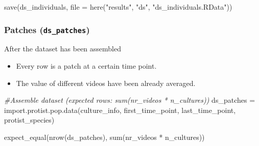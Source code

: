 \documentclass[
]{article}
\newenvironment{Shaded}{\begin{snugshade}}{\end{snugshade}}
\newcommand{\AttributeTok}[1]{\textcolor[rgb]{0.77,0.63,0.00}{#1}}
\newcommand{\CommentTok}[1]{\textcolor[rgb]{0.56,0.35,0.01}{\textit{#1}}}
\newcommand{\FunctionTok}[1]{\textcolor[rgb]{0.00,0.00,0.00}{#1}}
\newcommand{\NormalTok}[1]{#1}
\newcommand{\OtherTok}[1]{\textcolor[rgb]{0.56,0.35,0.01}{#1}}
\newcommand{\SpecialCharTok}[1]{\textcolor[rgb]{0.00,0.00,0.00}{#1}}
\newcommand{\StringTok}[1]{\textcolor[rgb]{0.31,0.60,0.02}{#1}}
\providecommand{\tightlist}{%
  \setlength{\itemsep}{0pt}\setlength{\parskip}{0pt}}
\begin{document}
\begin{Shaded}
\begin{Highlighting}[]
\FunctionTok{save}\NormalTok{(ds\_individuals, }\AttributeTok{file =} \FunctionTok{here}\NormalTok{(}\StringTok{"results"}\NormalTok{, }\StringTok{"ds"}\NormalTok{, }\StringTok{"ds\_individuals.RData"}\NormalTok{))}
\end{Highlighting}
\end{Shaded}

\hypertarget{patches-ds_patches}{%
\subsubsection{\texorpdfstring{Patches
(\texttt{ds\_patches})}{Patches (ds\_patches)}}\label{patches-ds_patches}}

After the dataset has been assembled

\begin{itemize}
\tightlist
\item
  Every row is a patch at a certain time point.
\item
  The value of different videos have been already averaged.
\end{itemize}

\begin{Shaded}
\begin{Highlighting}[]
\CommentTok{\#Assemble dataset (expected rows: sum(nr\_videos * n\_cultures))}
\NormalTok{ds\_patches }\OtherTok{=} \FunctionTok{import.protist.pop.data}\NormalTok{(culture\_info,}
\NormalTok{                                     first\_time\_point,}
\NormalTok{                                     last\_time\_point,}
\NormalTok{                                     protist\_species)}

\FunctionTok{expect\_equal}\NormalTok{(}\FunctionTok{nrow}\NormalTok{(ds\_patches), }
             \FunctionTok{sum}\NormalTok{(nr\_videos }\SpecialCharTok{*}\NormalTok{ n\_cultures))}
\end{Highlighting}
\end{Shaded}
\end{document}

